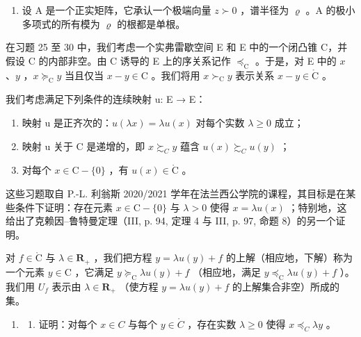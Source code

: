 \begin{enumerate}
\def\labelenumi{\alph{enumi})}
\setcounter{enumi}{1}
\tightlist
\item
  设 A 是一个正实矩阵，它承认一个极端向量 \(z \succ 0\) ，谱半径为 \(\varrho\) 。A 的极小多项式的所有模为 \(\varrho\) 的根都是单根。
\end{enumerate}

在习题 25 至 30 中，我们考虑一个实弗雷歇空间 E 和 E 中的一个闭凸锥 C，并假设 C 的内部非空。由 C 诱导的 E 上的序关系记作 \(\preccurlyeq_{\mathrm{C}}\) 。于是，对 E 中的 \(x\) 、\(y\) ，\(x \succcurlyeq_{\mathrm{C}} y\) 当且仅当 \(x - y \in \mathrm{C}\) 。我们将用 \(x \succ_{\mathrm{C}} y\) 表示关系 \(x - y \in \mathring{\mathrm{C}}\) 。

我们考虑满足下列条件的连续映射 u: E → E：

\begin{enumerate}
\def\labelenumi{(\roman{enumi})}
\item
  映射 u 是正齐次的：\(u(\lambda x) = \lambda u(x)\) 对每个实数 \(\lambda \geqslant 0\) 成立；
\item
  映射 u 关于 C 是递增的，即 \(x \succsim_{C} y\) 蕴含 \(u(x) \succsim_{C} u(y)\) ；
\item
  对每个 \(x \in \mathrm{C} - \{0\}\) ，有 \(u(x) \in \mathring{\mathrm{C}}\) 。
\end{enumerate}

这些习题取自 P.-L. 利翁斯 2020/2021 学年在法兰西公学院的课程，其目标是在某些条件下证明：存在元素 \(x \in \mathrm{C} - \{0\}\) 与 \(\lambda > 0\) 使得 \(x = \lambda u(x)\) ；特别地，这给出了克赖因–鲁特曼定理（III, p. 94, 定理 4 与 III, p. 97, 命题 8）的另一个证明。

对 \(f \in \mathring{\mathrm{C}}\) 与 \(\lambda \in \mathbf{R}_{+}\) ，我们把方程 \(y = \lambda u(y) + f\) 的上解（相应地，下解）称为一个元素 \(y \in \mathrm{C}\) ，它满足 \(y \succcurlyeq_{\mathrm{C}} \lambda u(y) + f\) （相应地，满足 \(y \preccurlyeq_{\mathrm{C}} \lambda u(y) + f\) ）。我们用 \(U_{f}\) 表示由 \(\lambda \in \mathbf{R}_{+}\) （使方程 \(y = \lambda u(y) + f\) 的上解集合非空）所成的集。

\begin{enumerate}
\def\labelenumi{\arabic{enumi})}
\setcounter{enumi}{24}
\tightlist
\item
  \begin{enumerate}
  \def\labelenumii{\alph{enumii})}
  \tightlist
  \item
    证明：对每个 \(x \in C\) 与每个 \(y \in \mathring{C}\) ，存在实数 \(\lambda \geqslant 0\) 使得 \(x \preccurlyeq_{C} \lambda y\) 。
  \end{enumerate}
\end{enumerate}

